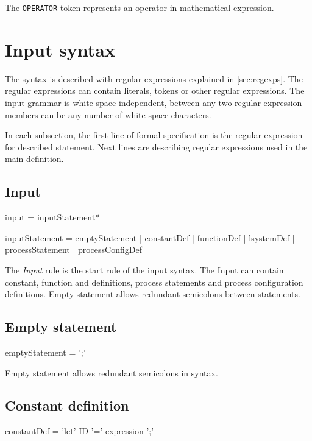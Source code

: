 The \texttt{OPERATOR} token represents an operator in mathematical expression.



\section{Input syntax}

The syntax is described with regular expressions explained in \autoref{sec:regexps}.
The regular expressions can contain literals, tokens or other regular expressions.
The input grammar is white-space independent, between any two regular expression members can be any number of white-space characters.

In each subsection, the first line of formal specification is the regular expression for described statement.
Next lines are describing regular expressions used in the main definition.


\subsection{Input}
\begin{Grammar}
input = inputStatement*

inputStatement = emptyStatement
	| constantDef
	| functionDef
	| lsystemDef
	| processStatement
	| processConfigDef
\end{Grammar}

The \emph{Input} rule is the start rule of the input syntax.
The Input can contain constant, function and \lsystem definitions, process statements and process configuration definitions.
Empty statement allows redundant semicolons between statements.


\subsection{Empty statement}

\begin{Grammar}
emptyStatement = ';'
\end{Grammar}

Empty statement allows redundant semicolons in syntax.


\subsection{Constant definition}
\begin{Grammar}
constantDef = 'let' ID '=' expression ';'
\end{Grammar}

